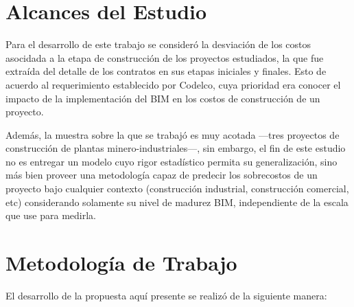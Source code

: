 \section{Alcances del Estudio}

Para el desarrollo de este trabajo se consideró la desviación de los costos asocidada a la etapa de construcción de los proyectos estudiados, la que fue extraída del detalle de los contratos en sus etapas iniciales y finales. Esto de acuerdo al requerimiento establecido por Codelco, cuya prioridad era conocer el impacto de la implementación del BIM en los costos de construcción de un proyecto.

Además, la muestra sobre la que se trabajó es muy acotada ---tres proyectos de construcción de plantas minero-industriales---, sin embargo, el fin de este estudio no es entregar un modelo cuyo rigor estadístico permita su generalización, sino más bien proveer una metodología capaz de predecir los sobrecostos de un proyecto bajo cualquier contexto (construcción industrial, construcción comercial, etc) considerando solamente su nivel de madurez BIM, independiente de la escala que use para medirla.


\section{Metodología de Trabajo}

El desarrollo de la propuesta aquí presente se realizó de la siguiente manera:

